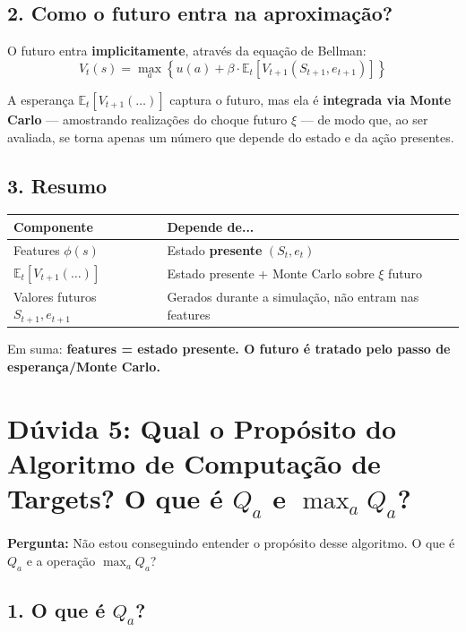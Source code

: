 \documentclass[12pt,a4paper]{article}
\begin{document}
\subsection{2. Como o futuro entra na aproximação?}

O futuro entra \textbf{implicitamente}, através da equação de Bellman:
\begin{equation}
    V_t(s) = \max_a \left\{ u(a) + \beta \cdot \mathbb{E}_t\!\left[V_{t+1}(S_{t+1}, e_{t+1})\right] \right\}
\end{equation}

A esperança $\mathbb{E}_t[V_{t+1}(\ldots)]$ captura o futuro, mas ela é \textbf{integrada via Monte Carlo} --- amostrando realizações do choque futuro $\xi$ --- de modo que, ao ser avaliada, se torna apenas um número que depende do estado e da ação presentes.

\subsection{3. Resumo}

\begin{center}
\begin{tabular}{ll}
\hline
\textbf{Componente} & \textbf{Depende de...} \\
\hline
Features $\phi(s)$ & Estado \textbf{presente} $(S_t, e_t)$ \\
$\mathbb{E}_t[V_{t+1}(\ldots)]$ & Estado presente + Monte Carlo sobre $\xi$ futuro \\
Valores futuros $S_{t+1}, e_{t+1}$ & Gerados durante a simulação, não entram nas features \\
\hline
\end{tabular}
\end{center}

Em suma: \textbf{features = estado presente. O futuro é tratado pelo passo de esperança/Monte Carlo.}

\section{Dúvida 5: Qual o Propósito do Algoritmo de Computação de Targets? O que é \texorpdfstring{$Q_a$}{Qa} e \texorpdfstring{$\max_a Q_a$}{max Qa}?}

\textbf{Pergunta:} Não estou conseguindo entender o propósito desse algoritmo. O que é $Q_a$ e a operação $\max_a Q_a$?

\subsection{1. O que é \texorpdfstring{$Q_a$}{Qa}?}
\end{document}

